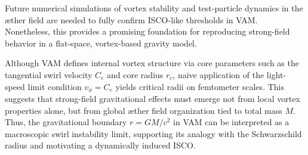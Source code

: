 Future numerical simulations of vortex stability and test-particle dynamics in the æther field are needed to fully confirm ISCO-like thresholds in VAM. Nonetheless, this provides a promising foundation for reproducing strong-field behavior in a flat-space, vortex-based gravity model.
\begin{remark}
Although VAM defines internal vortex structure via core parameters such as the tangential swirl velocity \( C_e \) and core radius \( r_c \), naive application of the light-speed limit condition \( v_\phi = C_e \) yields critical radii on femtometer scales. This suggests that strong-field gravitational effects must emerge not from local vortex properties alone, but from global æther field organization tied to total mass \( M \). Thus, the gravitational boundary \( r = GM/c^2 \) in VAM can be interpreted as a macroscopic swirl instability limit, supporting its analogy with the Schwarzschild radius and motivating a dynamically induced ISCO.
\end{remark}
